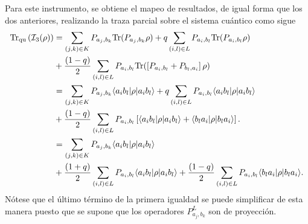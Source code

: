 Para este instrumento, se obtiene el mapeo de resultados, de igual forma que los dos anteriores, realizando la traza parcial sobre el sistema cuántico como sigue\begin{equation}\label{eq:traza_q_3instrument2p}
    \begin{split}
       {\rm Tr}_{\text{qu}}\left( \mathcal{I}_3(\rho)\right)&=\sum_{(j,k)\in K}  P_{a_j,b_k}{\rm Tr}(P_{a_j,b_k}\rho)+q\sum_{(i,l)\in L}P_{a_i,b_l} {\rm Tr}(P_{a_i,b_l}\rho) \\
        &+\dfrac{(1-q)}{2}\sum_{(i,l) \in L}P_{a_i,b_l} {\rm Tr}(\left[P_{a_i,b_l}+P_{b_l,a_i}\right]\rho)\\
        &=\sum_{(j,k)\in K}  P_{a_j,b_k}\langle a_i b_l|\rho|a_i b_l\rangle +q\sum_{(i,l)\in L}P_{a_i,b_l} \langle a_i b_l|\rho|a_i b_l\rangle \\
        &+\dfrac{(1-q)}{2}\sum_{(i,l) \in L}P_{a_i,b_l} \left[ \langle a_i b_l|\rho|a_i b_l\rangle + \langle b_l a_i|\rho| b_l a_i\rangle \right].\\
        &=\sum_{(j,k)\in K}  P_{a_j,b_k}\langle a_i b_l|\rho|a_i b_l\rangle \\
        &+\dfrac{(1+q)}{2}\sum_{(i,l)\in L}P_{a_i,b_l} \langle a_i b_l|\rho|a_i b_l\rangle +\dfrac{(1-q)}{2}\sum_{(i,l) \in L}P_{a_i,b_l} \langle b_l a_i|\rho| b_l a_i\rangle.\\
    \end{split}
\end{equation}Nótese que el último término de la primera igualdad  se puede simplificar de esta manera puesto que se supone que los operadores $P_{a_j,b_k}^L$ son de proyección. 





